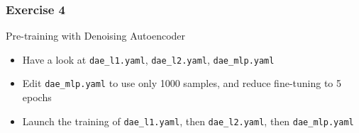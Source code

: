 \documentclass[mathserif, xcolor=dvipsnames]{beamer}
\begin{document}
\begin{frame}
    \frametitle{Exercise 4}
    \LARGE Pre-training with Denoising Autoencoder
    \begin{itemize}\addtolength{\itemsep}{0.5\baselineskip}
            \large
            \item{Have a look at \texttt{dae\_l1.yaml},
                  \texttt{dae\_l2.yaml}, \texttt{dae\_mlp.yaml}}
            \item{Edit \texttt{dae\_mlp.yaml} to use only 1000 samples,
                  and reduce fine-tuning to 5 epochs}
            \item{Launch the training of \texttt{dae\_l1.yaml}, then
                  \texttt{dae\_l2.yaml}, then \texttt{dae\_mlp.yaml}}
    \end{itemize}
\end{frame}
\end{document}
